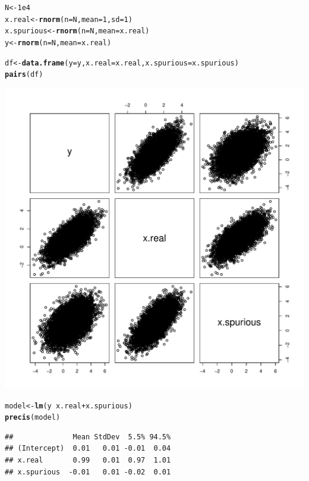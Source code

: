 \documentclass[12pt]{article}\usepackage[]{graphicx}\usepackage[]{color}
\makeatletter
\def\maxwidth{ %
  \ifdim\Gin@nat@width>\linewidth
    \linewidth
  \else
    \Gin@nat@width
  \fi
}
\newcommand{\hlnum}[1]{\textcolor[rgb]{0.686,0.059,0.569}{#1}}%
\newcommand{\hlopt}[1]{\textcolor[rgb]{0,0,0}{#1}}%
\newcommand{\hlstd}[1]{\textcolor[rgb]{0.345,0.345,0.345}{#1}}%
\newcommand{\hlkwb}[1]{\textcolor[rgb]{0.69,0.353,0.396}{#1}}%
\newcommand{\hlkwc}[1]{\textcolor[rgb]{0.333,0.667,0.333}{#1}}%
\newcommand{\hlkwd}[1]{\textcolor[rgb]{0.737,0.353,0.396}{\textbf{#1}}}%
\newenvironment{kframe}{%
 \def\at@end@of@kframe{}%
 \ifinner\ifhmode%
  \def\at@end@of@kframe{\end{minipage}}%
  \begin{minipage}{\columnwidth}%
 \fi\fi%
 \def\FrameCommand##1{\hskip\@totalleftmargin \hskip-\fboxsep
 \colorbox{shadecolor}{##1}\hskip-\fboxsep
     \hskip-\linewidth \hskip-\@totalleftmargin \hskip\columnwidth}%
 \MakeFramed {\advance\hsize-\width
   \@totalleftmargin\z@ \linewidth\hsize
   \@setminipage}}%
 {\par\unskip\endMakeFramed%
 \at@end@of@kframe}
\newenvironment{knitrout}{}{} %
\makeatother
\begin{document}
\begin{knitrout}
\color{fgcolor}\begin{kframe}
\begin{alltt}
\hlstd{N} \hlkwb{<-} \hlnum{1e4}
\hlstd{x.real} \hlkwb{<-} \hlkwd{rnorm}\hlstd{(}\hlkwc{n} \hlstd{= N,} \hlkwc{mean} \hlstd{=} \hlnum{1}\hlstd{,} \hlkwc{sd} \hlstd{=} \hlnum{1}\hlstd{)}
\hlstd{x.spurious} \hlkwb{<-} \hlkwd{rnorm}\hlstd{(}\hlkwc{n} \hlstd{= N,} \hlkwc{mean} \hlstd{= x.real)}
\hlstd{y} \hlkwb{<-} \hlkwd{rnorm}\hlstd{(}\hlkwc{n} \hlstd{= N,} \hlkwc{mean} \hlstd{= x.real)}

\hlstd{df} \hlkwb{<-} \hlkwd{data.frame}\hlstd{(}\hlkwc{y} \hlstd{= y,} \hlkwc{x.real} \hlstd{= x.real,} \hlkwc{x.spurious} \hlstd{= x.spurious)}
\hlkwd{pairs}\hlstd{(df)}
\end{alltt}
\end{kframe}
\includegraphics[width=\maxwidth]{figure/unnamed-chunk-2-1} 
\begin{kframe}\begin{alltt}
\hlstd{model} \hlkwb{<-} \hlkwd{lm}\hlstd{(y} \hlopt{~} \hlstd{x.real} \hlopt{+} \hlstd{x.spurious)}
\hlkwd{precis}\hlstd{(model)}
\end{alltt}
\begin{verbatim}
##              Mean StdDev  5.5% 94.5%
## (Intercept)  0.01   0.01 -0.01  0.04
## x.real       0.99   0.01  0.97  1.01
## x.spurious  -0.01   0.01 -0.02  0.01
\end{verbatim}
\end{kframe}
\end{knitrout}
\end{document}
